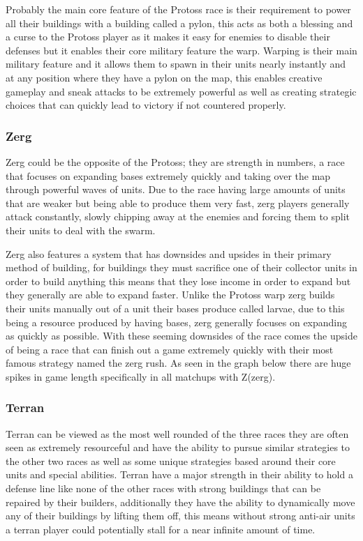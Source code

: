 \documentclass[a4paper,12pt]{report}
\begin{document}
Probably the main core feature of the Protoss race is their requirement to power all their buildings with a building called a pylon, this acts as both a blessing and a curse to the Protoss player as it makes it easy for enemies to disable their defenses but it enables their core military feature the warp. Warping is their main military feature and it allows them to spawn in their units nearly instantly and at any position where they have a pylon on the map, this enables creative gameplay and sneak attacks to be extremely powerful as well as creating strategic choices that can quickly lead to victory if not countered properly.

\subsubsection{Zerg}

Zerg could be the opposite of the Protoss; they are strength in numbers, a race that focuses on expanding bases extremely quickly and taking over the map through powerful waves of units. Due to the race having large amounts of units that are weaker but being able to produce them very fast, zerg players generally attack constantly, slowly chipping away at the enemies and forcing them to split their units to deal with the swarm.

Zerg also features a system that has downsides and upsides in their primary method of building, for buildings they must sacrifice one of their collector units in order to build anything this means that they lose income in order to expand but they generally are able to expand faster. Unlike the Protoss warp  zerg builds their units manually out of a unit their bases produce called larvae, due to this being a resource produced by having bases, zerg generally focuses on expanding as quickly as possible. With these seeming downsides of the race comes the upside of being a race that can finish out a game extremely quickly with their most famous strategy named the zerg rush. As seen in the graph below there are huge spikes in game length specifically in all matchups with Z(zerg).

\subsubsection{Terran}

Terran can be viewed as the most well rounded of the three races they are often seen as extremely resourceful and have the ability to pursue similar strategies to the other two races as well as some unique strategies based around their core units and special abilities. Terran have a major strength in their ability to hold a defense line like none of the other races with strong buildings that can be repaired by their builders, additionally they have the ability to dynamically move any of their buildings by lifting them off, this means without strong anti-air units a terran player could potentially stall for a near infinite amount of time.
\end{document}
